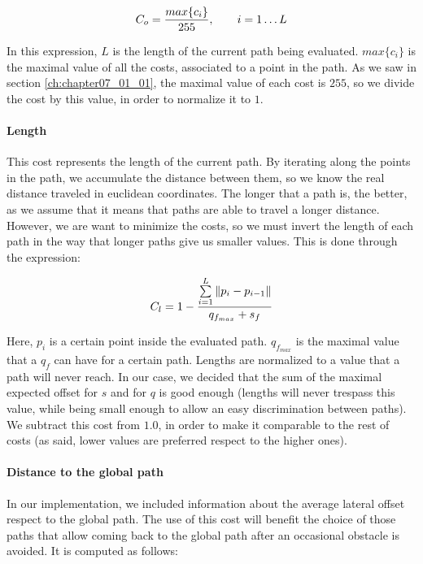\begin{equation}\label{eq:cp07_occlusion_cost}
C_o = {{max\{c_i\}} \over 255}, ~~~~~~ i=1 \dots L
\end{equation}

In this expression, $L$ is the length of the current path being evaluated. $max\{c_i\}$ is the maximal value of all the costs, associated to a point in the path. As we saw in section \ref{ch:chapter07_01_01}, the maximal value of each cost is $255$, so we divide the cost by this value, in order to normalize it to $1$.

\paragraph{Length}\label{ch:chapter07_01_04_00_02}

This cost represents the length of the current path. By iterating along the points in the path, we accumulate the distance between them, so we know the real distance traveled in euclidean coordinates. The longer that a path is, the better, as we assume that it means that paths are able to travel a longer distance. However, we are want to minimize the costs, so we must invert the length of each path in the way that longer paths give us smaller values. This is done through the expression:

\begin{equation}\label{eq:cp07_length_cost}
C_l = 1- {{\sum\limits_{i=1}^{L}\|p_i - p_{i - 1}\|} \over {q_{f_{max}} + s_f}}
\end{equation}

Here, $p_i$ is a certain point inside the evaluated path. $q_{f_{max}}$ is the maximal value that a $q_f$ can have for a certain path. Lengths are normalized to a value that a path will never reach. In our case, we decided that the sum of the maximal expected offset for $s$ and for $q$ is good enough (lengths will never trespass this value, while being small enough to allow an easy discrimination between paths). We subtract this cost from $1.0$, in order to make it comparable to the rest of costs (as said, lower values are preferred respect to the higher ones).

\paragraph{Distance to the global path}\label{ch:chapter07_01_04_00_03}

In our implementation, we included information about the average lateral offset respect to the global path. The use of this cost will benefit the choice of those paths that allow coming back to the global path after an occasional obstacle is avoided. It is computed as follows:

